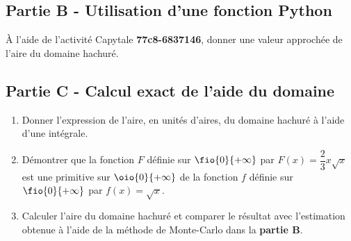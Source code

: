 \documentclass[a4paper,11pt,exos]{nsi} %
\begin{document}
\subsection*{Partie B - Utilisation d'une fonction Python}
À l'aide de l'activité Capytale \textbf{77c8-6837146}, donner une valeur approchée de l'aire du domaine hachuré.

\subsection*{Partie C - Calcul exact de l'aide du domaine}
\begin{enumerate}
    \item Donner l'expression de l'aire, en unités d'aires, du domaine hachuré à l'aide d'une intégrale.
    \item Démontrer que la fonction $F$ définie sur $\fio{0}{+\infty}$ par $F(x)=\dfrac{2}{3}x\sqrt{x}$ est une primitive sur $\oio{0}{+\infty}$ de la fonction $f$ définie sur $\fio{0}{+\infty}$ par $f(x)=\sqrt{x}$.
    \item Calculer l'aire du domaine hachuré et comparer le résultat avec l'estimation obtenue à l'aide de la méthode de Monte-Carlo dans la \textbf{partie B}.
\end{enumerate}
\end{document}

